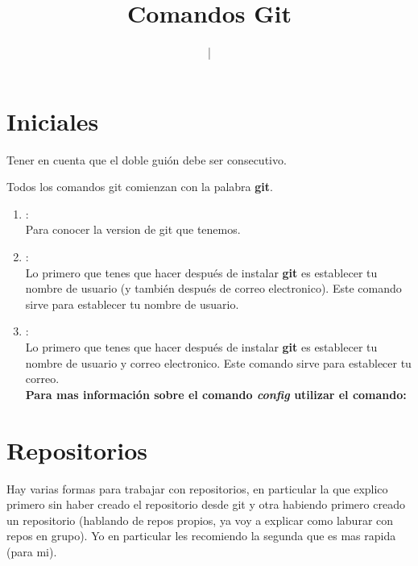 \documentclass[10pt,journal,compsoc]{IEEEtran}
\title{\bfseries \huge {Comandos Git} }
\author{
	\IEEEauthorblockN{Ezequiel Remus} 
	{|} \IEEEauthorblockA{
		Email: ezequielremus@gmail.com}
}
\begin{document}
\maketitle
\newpage
\tableofcontents
\pagestyle{fancy}

\section{Iniciales}
Tener en cuenta que el doble guión debe ser consecutivo. 

Todos los comandos git comienzan con la palabra \textbf{git}.
\begin{enumerate}
\item \underline{\textit{\color{Blue}{git - -version}}}:\\
 Para conocer la version de git que tenemos.
\\

\item \underline{\textit{\color{Blue}{git config - -global user.name $"nombreDeUsuario"$}}}:\\
Lo primero que tenes que hacer después de instalar \textbf{git} es establecer tu nombre de usuario (y también después de correo electronico). Este comando sirve para establecer tu nombre de usuario.
\\

\item \underline{\textit{\color{Blue}{git config - -global user.email $"TuCorreo"$}}}:\\
Lo primero que tenes que hacer después de instalar \textbf{git} es establecer tu nombre de usuario y correo electronico. Este comando sirve para establecer tu correo.
\\

\textbf{Para mas información sobre el comando \textit{config} utilizar el comando: \color{Blue}{git - -help config}}


\end{enumerate}
\section{Repositorios}
Hay varias formas para trabajar con repositorios, en particular la que explico primero sin haber creado el repositorio desde git y otra habiendo primero creado un repositorio (hablando de repos propios, ya voy a explicar como laburar con repos en grupo). Yo en particular les recomiendo la segunda que es mas rapida (para mi).
\end{document}
